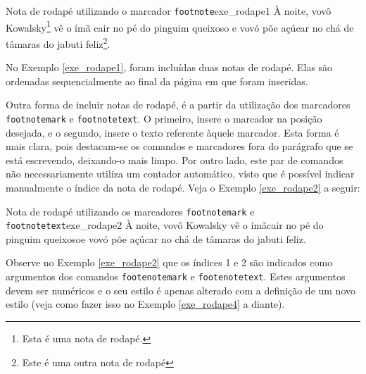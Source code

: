 \begin{texexptitled}[breakable,enhanced,middle=2mm]{Nota de rodapé utilizando o marcador {\tt footnote}}{exe_rodape1}
À noite, vovô Kowalsky\footnote{Esta é uma nota de rodapé.} vê o ímã 
cair no pé do pinguim queixoso e vovó põe açúcar no chá de tâmaras 
do jabuti feliz\footnote{Este é uma outra nota de rodapé}.
\end{texexptitled}

\addtocounter{footnote}{-2}

No Exemplo \ref{exe_rodape1}, foram incluídas duas notas de rodapé. Elas são ordenadas sequencialmente ao final da página em que foram inseridas.

Outra forma de incluir notas de rodapé, é a partir da utilização dos marcadores {\tt footnotemark} e {\tt footnotetext}. O primeiro, insere o marcador na posição desejada, e o segundo, insere o texto referente àquele marcador. Esta forma é mais clara, pois destacam-se os comandos e marcadores fora do parágrafo que se está escrevendo, deixando-o mais limpo. Por outro lado, este par de comandos não necessariamente utiliza um contador automático, visto que é possível indicar manualmente o índice da nota de rodapé. Veja o Exemplo \ref{exe_rodape2} a seguir:

\begin{texexptitled}[breakable,enhanced,middle=2mm]{Nota de rodapé utilizando os marcadores {\tt footnotemark} e {\tt footnotetext}}{exe_rodape2}
À noite, vovô Kowalsky vê o ímã\footnotemark[1] cair no pé do pinguim 
queixoso\footnotemark[2] e vovó põe açúcar no chá de tâmaras do 
jabuti feliz.

\end{texexptitled}

Observe no Exemplo \ref{exe_rodape2} que os índices 1 e 2 são indicados como argumentos dos comandos {\tt footenotemark} e {\tt footenotetext}. Estes argumentos devem ser numéricos e o seu estilo é apenas alterado com a definição de um novo estilo (veja como fazer isso no Exemplo \ref{exe_rodape4} a diante).

%

